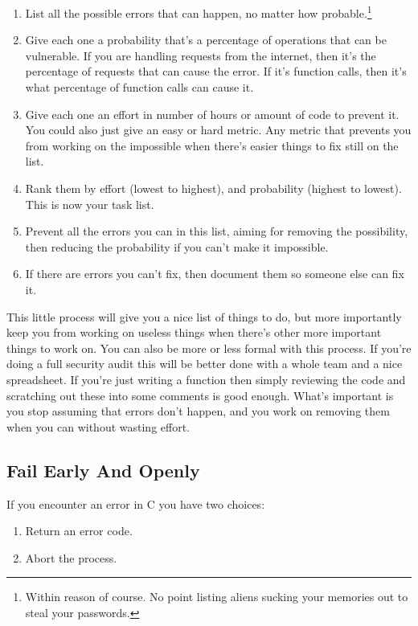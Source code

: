 \begin{enumerate}
\item List all the possible errors that can happen, no matter how probable.\footnote{Within reason of course.  No point
    listing aliens sucking your memories out to steal your passwords.}
\item Give each one a probability that's a percentage of operations that can be vulnerable.  If you are handling
    requests from the internet, then it's the percentage of requests that can cause the error.  If it's 
    function calls, then it's what percentage of function calls can cause it.
\item Give each one an effort in number of hours or amount of code to prevent it.  You could also just give an
    easy or hard metric.  Any metric that prevents you from working on the impossible when there's easier
    things to fix still on the list.
\item Rank them by effort (lowest to highest), and probability (highest to lowest).  This is now your task list.
\item Prevent all the errors you can in this list, aiming for removing the possibility, then reducing the
    probability if you can't make it impossible.
\item If there are errors you can't fix, then document them so someone else can fix it.
\end{enumerate}

This little process will give you a nice list of things to do, but more importantly keep you from
working on useless things when there's other more important things to work on.  You can also be
more or less formal with this process.  If you're doing a full security audit this will be better
done with a whole team and a nice spreadsheet.  If you're just writing a function then simply
reviewing the code and scratching out these into some comments is good enough.  What's important
is you stop assuming that errors don't happen, and you work on removing them when you can without
wasting effort.


\subsection{Fail Early And Openly}

If you encounter an error in C you have two choices:

\begin{enumerate}
\item Return an error code.
\item Abort the process.
\end{enumerate}

